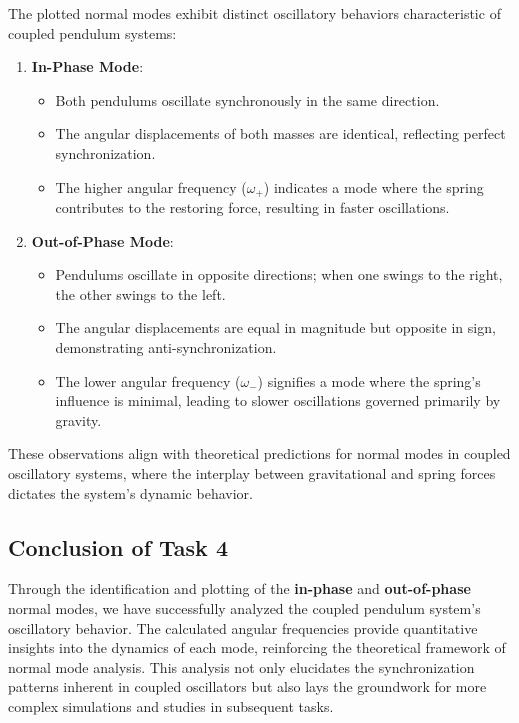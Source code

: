 \documentclass[12pt]{report} %
\begin{document}
The plotted normal modes exhibit distinct oscillatory behaviors characteristic of coupled pendulum systems:

\begin{enumerate}
    \item \textbf{In-Phase Mode}:
    \begin{itemize}
        \item Both pendulums oscillate synchronously in the same direction.
        \item The angular displacements of both masses are identical, reflecting perfect synchronization.
        \item The higher angular frequency (\( \omega_+ \)) indicates a mode where the spring contributes to the restoring force, resulting in faster oscillations.
    \end{itemize}
    
    \item \textbf{Out-of-Phase Mode}:
    \begin{itemize}
        \item Pendulums oscillate in opposite directions; when one swings to the right, the other swings to the left.
        \item The angular displacements are equal in magnitude but opposite in sign, demonstrating anti-synchronization.
        \item The lower angular frequency (\( \omega_- \)) signifies a mode where the spring's influence is minimal, leading to slower oscillations governed primarily by gravity.
    \end{itemize}
\end{enumerate}

These observations align with theoretical predictions for normal modes in coupled oscillatory systems, where the interplay between gravitational and spring forces dictates the system's dynamic behavior.

\subsection{Conclusion of Task 4}
\label{subsec:part1_task4_conclusion}

Through the identification and plotting of the \textbf{in-phase} and \textbf{out-of-phase} normal modes, we have successfully analyzed the coupled pendulum system's oscillatory behavior. The calculated angular frequencies provide quantitative insights into the dynamics of each mode, reinforcing the theoretical framework of normal mode analysis. This analysis not only elucidates the synchronization patterns inherent in coupled oscillators but also lays the groundwork for more complex simulations and studies in subsequent tasks.
\end{document}
